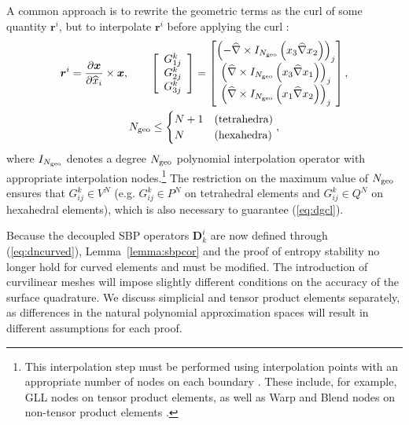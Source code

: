 \documentclass{svjour3}                     %
\renewcommand{\hat}{\widehat}
\newcommand{\pd}[2]{\frac{\partial#1}{\partial#2}}
\newcommand{\LRp}[1]{\left( #1 \right)}
\newcommand{\LRs}[1]{\left[ #1 \right]}
\newcommand{\Grad} {\ensuremath{\nabla}}
\begin{document}
A common approach is to rewrite the geometric terms as the curl of some quantity $\bm{r}^i$, but to interpolate $\bm{r}^i$ before applying the curl \cite{visbal2002use, kopriva2006metric, hindenlang2012explicit, chan2018discretely}:
\begin{gather}
\bm{r}^i = { \pd{\bm{x}}{\hat{x}_i}\times \bm{x}}, \qquad
\LRs{\begin{array}{c}
{G}^k_{1j}\\
{G}^k_{2j}\\
{G}^k_{3j}\end{array}} = \begin{bmatrix}
\LRp{-\hat{\Grad}\times I_{N_{\rm geo}}\LRp{x_3\hat{\Grad}x_2}}_j\\
\LRp{\hat{\Grad}\times I_{N_{\rm geo}}\LRp{x_3\hat{\Grad}x_1}}_j\\
\LRp{\hat{\Grad}\times I_{N_{\rm geo}}\LRp{x_1\hat{\Grad}x_2}}_j
\end{bmatrix},\\
N_{\rm geo} \leq \begin{cases}
N+1 & \text{(tetrahedra)}\\
N & \text{(hexahedra)}
\end{cases},\nonumber
\label{eq:iconscurl}
\end{gather}
where $I_{N_{\rm geo}}$ denotes a degree $N_{\rm geo}$ polynomial interpolation operator with appropriate interpolation nodes.\footnote{This interpolation step must be performed using interpolation points with an appropriate number of nodes on each boundary \cite{chan2018discretely}.  These include, for example, GLL nodes on tensor product elements, as well as Warp and Blend nodes on non-tensor product elements \cite{warburton2006explicit, chan2015comparison}.}  The restriction on the maximum value of $N_{\rm geo}$ ensures that $G^k_{ij} \in V^N$ (e.g. $G^k_{ij} \in P^N$ on tetrahedral elements and $G^k_{ij}\in Q^N$ on hexahedral elements), which is also necessary to guarantee (\ref{eq:dgcl}).

Because the decoupled SBP operators $\bm{D}^i_k$ are now defined through (\ref{eq:dncurved}), Lemma~\ref{lemma:sbpcor} and the proof of entropy stability no longer hold for curved elements and must be modified.  The introduction of curvilinear meshes will impose slightly different conditions on the accuracy of the surface quadrature.  We discuss simplicial and tensor product elements separately, as differences in the natural polynomial approximation spaces will result in different assumptions for each proof.
\end{document}
